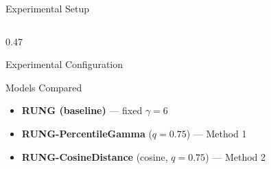 \documentclass[aspectratio=169]{beamer}
\newcommand{\rungbase}{\textcolor{rungblue}{\textbf{RUNG (baseline)}}}
\newcommand{\rungpct}{\textcolor{runggreen}{\textbf{RUNG-PercentileGamma}}}
\newcommand{\rungcos}{\textcolor{rungorange}{\textbf{RUNG-CosineDistance}}}
\begin{document}
\begin{frame}{Experimental Setup}
\begin{columns}[T]
\begin{column}{0.47\textwidth}
\begin{block}{Experimental Configuration}
      \end{block}
      \vspace{6pt}
      \begin{block}{Models Compared}
        \begin{itemize}
          \item \rungbase{} --- fixed $\gamma = 6$
          \item \rungpct{} ($q=0.75$) --- Method 1
          \item \rungcos{} (cosine, $q=0.75$) --- Method 2
        \end{itemize}
      \end{block}
    \end{column}
  \end{columns}
\end{frame}

\end{document}
